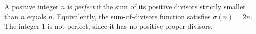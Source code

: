 
A positive integer $n$ is \emph{perfect} if the sum of its positive divisors strictly smaller than $n$ equals $n$. Equivalently, the sum-of-divisors function satisfies $\sigma(n)=2n$. The integer $1$ is not perfect, since it has no positive proper divisors.
